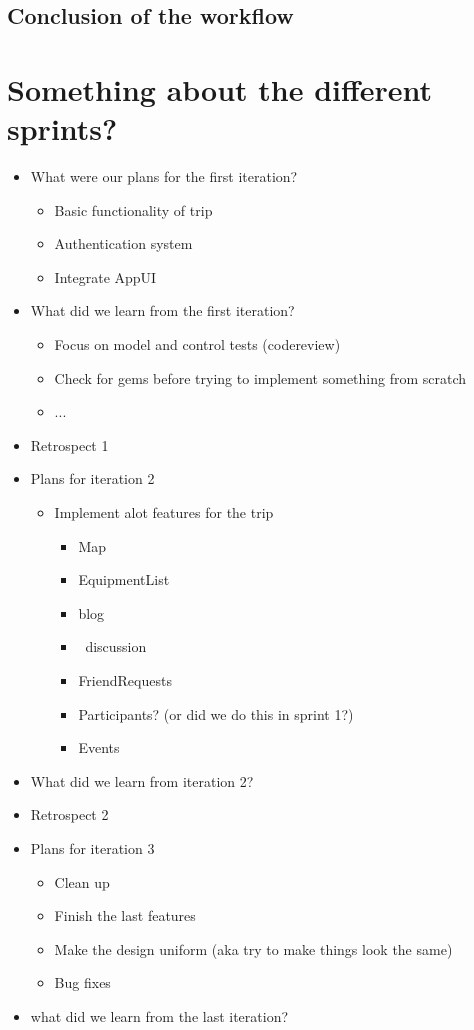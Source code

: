 \documentclass[a4paper]{article}
\begin{document}
\subsection{Conclusion of the workflow}


\section{Something about the different sprints?}
\begin{itemize}
  \item {What were our plans for the first iteration?
  \begin{itemize}
    \item {Basic functionality of trip}
    \item {Authentication system}
    \item {Integrate AppUI}
  \end{itemize}}
  \item {What did we learn from the first iteration?
  \begin{itemize}
    \item {Focus on model and control tests (codereview)}
    \item {Check for gems before trying to implement something from scratch}
    \item {...}
  \end{itemize}}
  \item {Retrospect 1}
  \item {Plans for iteration 2
  \begin{itemize}
    \item {Implement alot features for the trip
    \begin{itemize}
      \item {Map}
      \item {EquipmentList}
      \item {blog}
      \item {discussion}
      \item {FriendRequests}
      \item {Participants? (or did we do this in sprint 1?)}
      \item {Events}
    \end{itemize}}
  \end{itemize}}
  \item {What did we learn from iteration 2?}
  \item {Retrospect 2}
  \item {Plans for iteration 3
  \begin{itemize}
    \item {Clean up}
    \item {Finish the last features}
    \item {Make the design uniform (aka try to make things look the same)}
    \item {Bug fixes}
  \end{itemize}}
  \item {what did we learn from the last iteration?}
\end{itemize}
\end{document}

